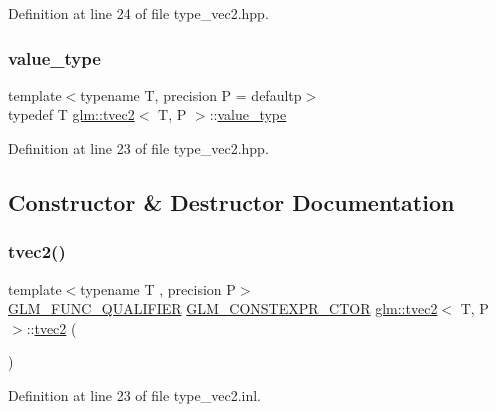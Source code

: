 Definition at line 24 of file type\+\_\+vec2.\+hpp.

\mbox{\label{structglm_1_1tvec2_a45de6851b3de40183d7e35deb7cb27ab}} 
\subsubsection{\texorpdfstring{value\_type}{value\_type}}
{\footnotesize\ttfamily template$<$typename T, precision P = defaultp$>$ \\
typedef T \mbox{\hyperlink{structglm_1_1tvec2}{glm\+::tvec2}}$<$ T, P $>$\+::\mbox{\hyperlink{structglm_1_1tvec2_a45de6851b3de40183d7e35deb7cb27ab}{value\+\_\+type}}}



Definition at line 23 of file type\+\_\+vec2.\+hpp.



\subsection{Constructor \& Destructor Documentation}
\mbox{\label{structglm_1_1tvec2_ab05030327b4fa4ddc35e3c905f8e4f7f}} 
\subsubsection{\texorpdfstring{tvec2()}{tvec2()}\hspace{0.1cm}{\footnotesize\ttfamily [1/17]}}
{\footnotesize\ttfamily template$<$typename T , precision P$>$ \\
\mbox{\hyperlink{setup_8hpp_a33fdea6f91c5f834105f7415e2a64407}{G\+L\+M\+\_\+\+F\+U\+N\+C\+\_\+\+Q\+U\+A\+L\+I\+F\+I\+ER}} \mbox{\hyperlink{setup_8hpp_ad34178a09666081abdb573c14d1f4a5a}{G\+L\+M\+\_\+\+C\+O\+N\+S\+T\+E\+X\+P\+R\+\_\+\+C\+T\+OR}} \mbox{\hyperlink{structglm_1_1tvec2}{glm\+::tvec2}}$<$ T, P $>$\+::\mbox{\hyperlink{structglm_1_1tvec2}{tvec2}} (\begin{DoxyParamCaption}{ }\end{DoxyParamCaption})}



Definition at line 23 of file type\+\_\+vec2.\+inl.

